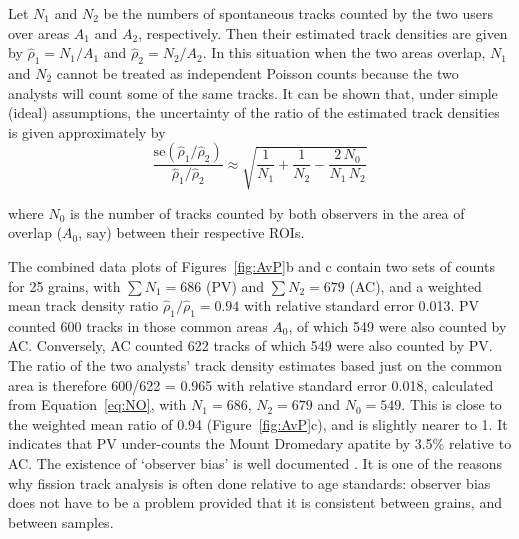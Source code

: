 \documentclass[gchron, manuscript]{copernicus}
\begin{document}
Let $N_1$ and $N_2$ be the numbers of spontaneous tracks counted by
the two users over areas $A_1$ and $A_2$, respectively. Then their
estimated track densities are given by $\hat{\rho}_1 = N_1/A_1$ and
$\hat{\rho}_2 = N_2/A_2$. In this situation when the two areas
overlap, $N_1$ and $N_2$ cannot be treated as independent Poisson
counts because the two analysts will count some of the same tracks. It
can be shown that, under simple (ideal) assumptions, the uncertainty
of the ratio of the estimated track densities is given approximately
by
\begin{equation}
  \frac{\mbox{se}(\hat{\rho}_1/\hat{\rho}_2)}{\hat{\rho}_1/\hat{\rho}_2} \approx
  \sqrt{ \frac{1}{N_1} + \frac{1}{N_2} - \frac{2\,N_0}{N_1\,N_2} }
  \label{eq:NO}
\end{equation}

\noindent where $N_0$ is the number of tracks counted by both
observers in the area of overlap ($A_0$, say) between their respective
ROIs.\medskip 

The combined data plots of Figures~\ref{fig:AvP}b and c contain two
sets of counts for 25 grains, with $\sum N_{1} = 686$ (PV) and $\sum
N_{2} = 679$ (AC), and a weighted mean track density ratio
$\hat{\rho}_{1}/\hat{\rho}_{1} = 0.94$ with relative standard error
0.013. PV counted 600 tracks in those common areas $A_0$, of which 549
were also counted by AC. Conversely, AC counted 622 tracks of which
549 were also counted by PV. The ratio of the two analysts' track
density estimates based just on the common area is therefore 600/622 =
0.965 with relative standard error 0.018, calculated from
Equation~\ref{eq:NO}, with $N_1 = 686$, $N_2 = 679$ and $N_0 = 549$.
This is close to the weighted mean ratio of 0.94
(Figure~\ref{fig:AvP}c), and is slightly nearer to 1. It indicates
that PV under-counts the Mount Dromedary apatite by 3.5\% relative to
AC.  The existence of `observer bias' is well documented
\citep{tamer2025}.  It is one of the reasons why fission track
analysis is often done relative to age standards: observer bias does
not have to be a problem provided that it is consistent between
grains, and between samples.\medskip
\end{document}
